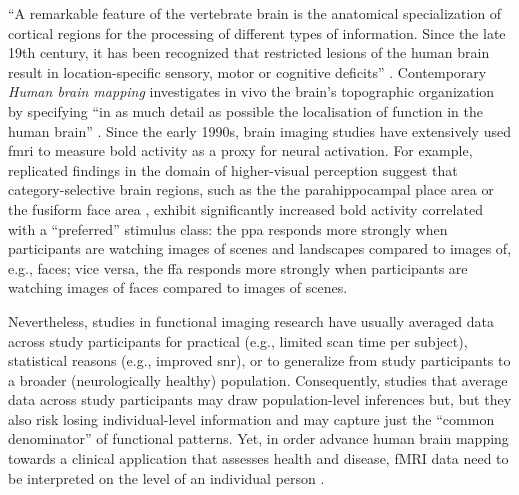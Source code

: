 

``A remarkable feature of the vertebrate brain is the anatomical specialization
of cortical regions for the processing of different types of information. Since
the late 19th century, it has been recognized that restricted lesions of the
human brain result in location-specific sensory, motor or cognitive deficits''
\citep[][p. 268]{cohen1994localization}.
Contemporary \textit{Human brain mapping} \citep[e.g.,][]{raichle2009brief}
investigates in vivo the brain's topographic organization
\citep[e.g.,][]{eickhoff2018topographic} by specifying ``in as much detail as
possible the localisation of function in the human brain'' \citep[][p.
10]{savoy2001history}.
Since the early 1990s, brain imaging studies have extensively used \ac{fmri} to
measure \ac{bold} activity as a proxy for neural activation.
For example, replicated findings in the domain of higher-visual perception
suggest that category-selective brain regions, such as the the parahippocampal
place area \citep{epstein1998ppa, epstein1999parahippocampal} or the fusiform
face area \citep{kanwisher1997ffa, kanwisher2006fusiform}, exhibit significantly
increased \ac{bold} activity correlated with a ``preferred'' stimulus class:
%
the \ac{ppa} responds more strongly when participants are watching images of
scenes and landscapes compared to images of, e.g., faces;
%
vice versa, the \ac{ffa} responds more strongly when participants are watching
images of faces compared to images of scenes.

%
Nevertheless, studies in functional imaging research have usually averaged data
across study participants for
%
practical (e.g., limited scan time per subject),
%
statistical reasons (e.g., improved \ac{snr}),
%
or to generalize from study participants to a broader (neurologically healthy)
population.
%
Consequently, studies that average data across study participants may draw
population-level inferences but, but they also risk losing individual-level
information and may capture just the ``common denominator''
\citep[][p. 2]{pinel2007fast} of functional patterns.
%
Yet, in order advance human brain mapping towards a clinical application
that assesses health and disease, fMRI data need to be interpreted on the level
of an individual person \citep{dubois2016building, wegrzyn2018thought}.



